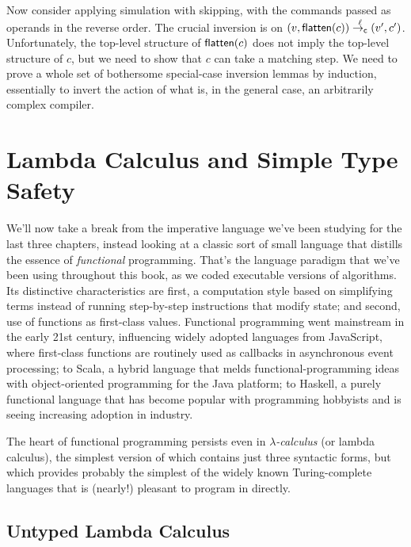 \documentclass{amsbook}
\theoremstyle{definition}
\theoremstyle{remark}
\numberwithin{section}{chapter}
\numberwithin{equation}{chapter}
\begin{document}
Now consider applying simulation with skipping, with the commands passed as operands in the reverse order.
The crucial inversion is on $(v, \mathsf{flatten}(c)) \stackrel{\ell}{\to_\mathsf{c}} (v', c')$.
Unfortunately, the top-level structure of $\mathsf{flatten}(c)$ does not imply the top-level structure of $c$, but we need to show that $c$ can take a matching step.
We need to prove a whole set of bothersome special-case inversion lemmas by induction, essentially to invert the action of what is, in the general case, an arbitrarily complex compiler.



\chapter{Lambda Calculus and Simple Type Safety}\label{types}

We'll now take a break from the imperative language we've been studying for the last three chapters, instead looking at a classic sort of small language that distills the essence of \emph{functional} programming.
That's the language paradigm that we've been using throughout this book, as we coded executable versions of algorithms.
Its distinctive characteristics are first, a computation style based on simplifying terms instead of running step-by-step instructions that modify state; and second, use of functions as first-class values.
Functional programming went mainstream in the early 21st century, influencing widely adopted languages from JavaScript, where first-class functions are routinely used as callbacks in asynchronous event processing; to Scala, a hybrid language that melds functional-programming ideas with object-oriented programming for the Java platform; to Haskell, a purely functional language that has become popular with programming hobbyists and is seeing increasing adoption in industry.

The heart of functional programming persists even in \emph{$\lambda$-calculus} (or lambda calculus), the simplest version of which contains just three syntactic forms, but which provides probably the simplest of the widely known Turing-complete languages that is (nearly!) pleasant to program in directly.


\section{Untyped Lambda Calculus}
\end{document}
